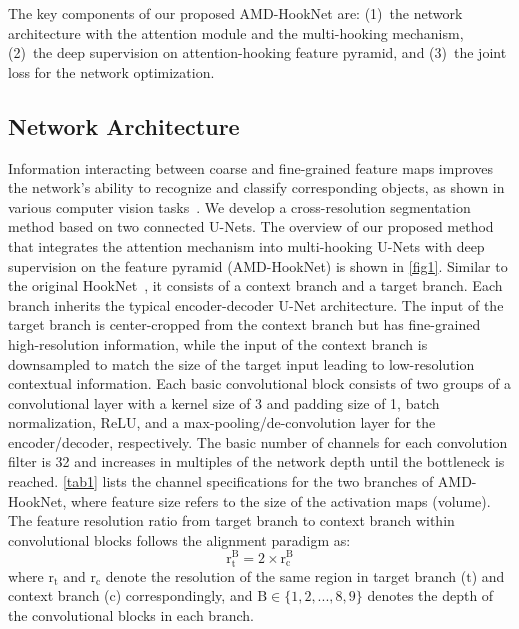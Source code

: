 \documentclass[lettersize,journal,siunitx]{IEEEtran}
\begin{document}
The key components of our proposed AMD-HookNet are: (1)~the network architecture with the attention module and the multi-hooking mechanism, (2)~the deep supervision on attention-hooking feature pyramid, and (3)~the joint loss for the network optimization.

\subsection{Network Architecture}
Information interacting between coarse and fine-grained feature maps improves the network's ability to recognize and classify corresponding objects, as shown in various computer vision tasks~\cite{van2021hooknet,li2019siamrpn++,wosner2021object,zhao2015dirichlet}. 
We develop a cross-resolution segmentation method based on two connected U-Nets. The overview of our proposed method that integrates the attention mechanism into multi-hooking U-Nets with deep supervision on the feature pyramid (AMD-HookNet) is shown in \cref{fig1}. Similar to the original HookNet~\cite{van2021hooknet}, it consists of a context branch and a target branch. Each branch inherits the typical encoder-decoder U-Net architecture. The input of the target branch is center-cropped from the context branch but has fine-grained high-resolution information, while the input of the context branch is downsampled to match the size of the target input leading to low-resolution contextual information. Each basic convolutional block consists of two groups of a convolutional layer with a kernel size of 3 and padding size of 1, batch normalization, ReLU, and a max-pooling/de-convolution layer for the encoder/decoder, respectively. The basic number of channels for each convolution filter is 32 and increases in multiples of the network depth until the bottleneck is reached. \cref{tab1} lists the channel specifications for the two branches of AMD-HookNet, where feature size refers to the size of the activation maps (volume). The feature resolution ratio from target branch to context branch within convolutional blocks follows the alignment paradigm as:
\begin{equation}
     \mathrm{r^{B}_{t}}=\mathrm{2\times{r^{B}_{c}}}
\end{equation}
where $\mathrm{r_{t}}$ and $\mathrm{r_{c}}$ denote the resolution of the same region in target branch ($\mathrm{t}$) and context branch ($\mathrm{c}$) correspondingly, and $\mathrm{B\in{\{1,2,...,8,9\}}}$ denotes the depth of the convolutional blocks in each branch. 
\end{document}
